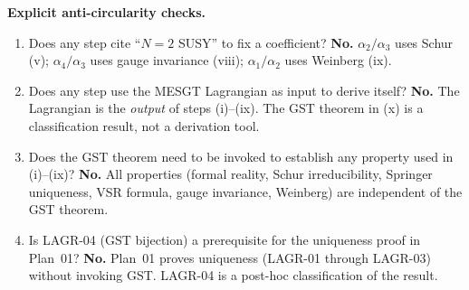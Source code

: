 \textbf{Explicit anti-circularity checks.}
\begin{enumerate}
  \item[(AC1)] Does any step cite ``$N=2$ SUSY'' to fix a coefficient?
    \textbf{No.} $\alpha_2/\alpha_3$ uses Schur (v);
    $\alpha_4/\alpha_3$ uses gauge invariance (viii);
    $\alpha_1/\alpha_2$ uses Weinberg (ix).
  \item[(AC2)] Does any step use the MESGT Lagrangian as input to
    derive itself? \textbf{No.} The Lagrangian is the \emph{output}
    of steps (i)--(ix). The GST theorem in (x) is a classification
    result, not a derivation tool.
  \item[(AC3)] Does the GST theorem need to be invoked to establish
    any property used in (i)--(ix)? \textbf{No.} All properties
    (formal reality, Schur irreducibility, Springer uniqueness, VSR
    formula, gauge invariance, Weinberg) are independent of the
    GST theorem.
  \item[(AC4)] Is LAGR-04 (GST bijection) a prerequisite for the
    uniqueness proof in Plan~01? \textbf{No.} Plan~01 proves
    uniqueness (LAGR-01 through LAGR-03) without invoking GST.
    LAGR-04 is a post-hoc classification of the result.
\end{enumerate}



